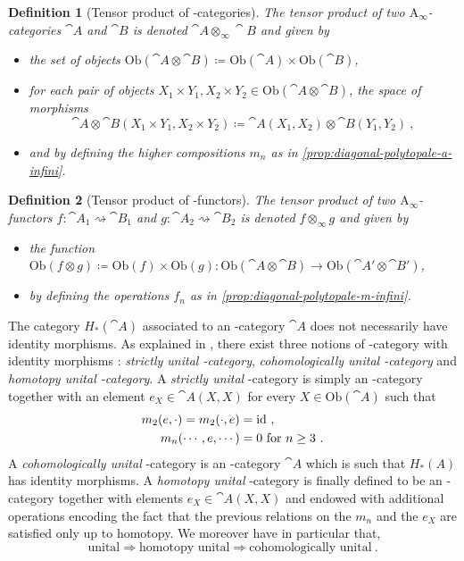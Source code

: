 \documentclass[twoside, 12pt]{amsart}
\newtheorem{definition}{Definition}[section]
\theoremstyle{remark}
\begin{document}
\begin{definition}[Tensor product of \Ainf -categories] \label{def:tensor-product-ainf-cat}
The \emph{tensor product} of two $\mathrm{A}_\infty$-categories $\cat{A}$ and $\cat{B}$ is denoted $\cat{A} \otimes_\infty \cat{B}$ and given by 
\begin{itemize}[leftmargin=*]
  \item the set of objects $\mathrm{Ob}(\cat{A}\otimes \cat{B})\coloneqq \mathrm{Ob}(\cat{A})\times\mathrm{Ob}(\cat{B})$,
  \item for each pair of objects $X_1\times Y_1,X_2\times Y_2 \in \mathrm{Ob}(\cat{A}\otimes \cat{B})$, the space of morphisms \[\cat{A}\otimes \cat{B}(X_1\times Y_1,X_2\times Y_2)\coloneqq \cat{A}(X_1,X_2)\otimes\cat{B}(Y_1,Y_2) \ , \]
  \item and by defining the higher compositions $m_n$ as in \cref{prop:diagonal-polytopale-a-infini}.
\end{itemize}
\end{definition}

\begin{definition}[Tensor product of \Ainf -functors]
The \emph{tensor product} of two $\mathrm{A}_\infty$-functors $f:\cat{A}_1 \rightsquigarrow \cat{B}_1$ and $g:\cat{A}_2 \rightsquigarrow \cat{B}_2$ is denoted $f\otimes_\infty g$ and given by 
\begin{itemize}[leftmargin=*]
\item the function $\mathrm{Ob}(f\otimes g)\coloneqq \mathrm{Ob}(f)\times \mathrm{Ob}(g) : \mathrm{Ob}(\cat{A}\otimes\cat{B}) \to \mathrm{Ob}(\cat{A}'\otimes\cat{B}')$,
\item by defining the operations $f_n$ as in \cref{prop:diagonal-polytopale-m-infini}.
\end{itemize}
\end{definition}

The category $H_*(\cat{A})$ associated to an \Ainf -category $\cat{A}$ does not necessarily have identity morphisms. As explained in \cite[Section 1.2]{Seidel08}, there exist three notions of \Ainf -category with identity morphisms : \textit{strictly unital \Ainf -category}, \textit{cohomologically unital \Ainf -category} and \textit{homotopy unital \Ainf -category}. 
A \textit{strictly unital} \Ainf -category is simply an \Ainf -category together with an element $e_X \in \cat{A} (X ,X )$ for every $X \in \mathrm{Ob}(\cat{A})$ such that \begin{align*}
m_2 (e , \cdot ) = m_2 (\cdot , e ) &= \mathrm{id} \ , \\
m_n ( \cdots , e , \cdots ) &= 0 \text { for } n \geq 3 \ .
\end{align*} 
A \textit{cohomologically unital} \Ainf -category is an \Ainf -category $\cat{A}$ which is such that $H_*(A)$ has identity morphisms.
A \textit{homotopy unital} \Ainf -category is finally defined to be an \Ainf -category together with elements $e_X \in \cat{A} (X ,X )$ and endowed with additional operations encoding the fact that the previous relations on the $m_n$ and the $e_X$ are satisfied only up to homotopy.
We moreover have in particular that,
\[  \text{unital} \Rightarrow \text{homotopy unital} \Rightarrow \text{cohomologically unital} \ . \]
\end{document}
